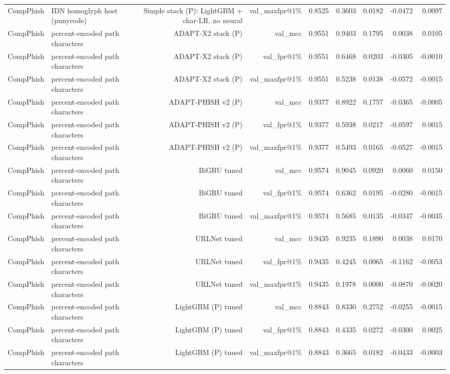 \begin{table}[t]
\begin{tabular}{llrrrrrrr}
CompPhish & IDN homoglyph host (punycode) & Simple stack (P): LightGBM + char-LR, no neural & val\_maxfpr@1\% & 0.8525 & 0.3603 & 0.0182 & -0.0472 & 0.0097 \\
CompPhish & percent-encoded path characters & ADAPT-X2 stack (P) & val\_mcc & 0.9551 & 0.9403 & 0.1795 & 0.0038 & 0.0105 \\
CompPhish & percent-encoded path characters & ADAPT-X2 stack (P) & val\_fpr@1\% & 0.9551 & 0.6468 & 0.0203 & -0.0305 & -0.0010 \\
CompPhish & percent-encoded path characters & ADAPT-X2 stack (P) & val\_maxfpr@1\% & 0.9551 & 0.5238 & 0.0138 & -0.0572 & -0.0015 \\
CompPhish & percent-encoded path characters & ADAPT-PHISH v2 (P) & val\_mcc & 0.9377 & 0.8922 & 0.1757 & -0.0365 & -0.0005 \\
CompPhish & percent-encoded path characters & ADAPT-PHISH v2 (P) & val\_fpr@1\% & 0.9377 & 0.5938 & 0.0217 & -0.0597 & 0.0015 \\
CompPhish & percent-encoded path characters & ADAPT-PHISH v2 (P) & val\_maxfpr@1\% & 0.9377 & 0.5493 & 0.0165 & -0.0527 & -0.0015 \\
CompPhish & percent-encoded path characters & BiGRU tuned & val\_mcc & 0.9574 & 0.9045 & 0.0920 & 0.0060 & 0.0150 \\
CompPhish & percent-encoded path characters & BiGRU tuned & val\_fpr@1\% & 0.9574 & 0.6362 & 0.0195 & -0.0280 & -0.0015 \\
CompPhish & percent-encoded path characters & BiGRU tuned & val\_maxfpr@1\% & 0.9574 & 0.5685 & 0.0135 & -0.0347 & -0.0035 \\
CompPhish & percent-encoded path characters & URLNet tuned & val\_mcc & 0.9435 & 0.9235 & 0.1890 & 0.0038 & 0.0170 \\
CompPhish & percent-encoded path characters & URLNet tuned & val\_fpr@1\% & 0.9435 & 0.4245 & 0.0065 & -0.1162 & -0.0053 \\
CompPhish & percent-encoded path characters & URLNet tuned & val\_maxfpr@1\% & 0.9435 & 0.1978 & 0.0000 & -0.0870 & -0.0020 \\
CompPhish & percent-encoded path characters & LightGBM (P) tuned & val\_mcc & 0.8843 & 0.8330 & 0.2752 & -0.0255 & -0.0015 \\
CompPhish & percent-encoded path characters & LightGBM (P) tuned & val\_fpr@1\% & 0.8843 & 0.4335 & 0.0272 & -0.0300 & 0.0025 \\
CompPhish & percent-encoded path characters & LightGBM (P) tuned & val\_maxfpr@1\% & 0.8843 & 0.3665 & 0.0182 & -0.0433 & -0.0003 \\

\end{tabular}
\end{table}

